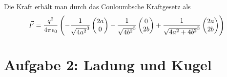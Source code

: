 \documentclass[a4paper,german,12pt,smallheadings]{scrartcl}
\begin{document}
Die Kraft erhält man durch das Couloumbsche Kraftgesetz als
\begin{align*}
  \vec{F} = \frac{q^2}{4 \pi \epsilon_0} \del{
    -\frac{1}{\sqrt{4a^2}^3} \begin{pmatrix} 2a \\ 0 \end{pmatrix}
    -\frac{1}{\sqrt{4b^2}^3} \begin{pmatrix} 0  \\ 2b \end{pmatrix}
    +\frac{1}{\sqrt{4a^2+4b^2}^3} \begin{pmatrix} 2a \\ 2b \end{pmatrix}
  }
\end{align*}

\section*{Aufgabe 2: Ladung und Kugel}
\end{document}
